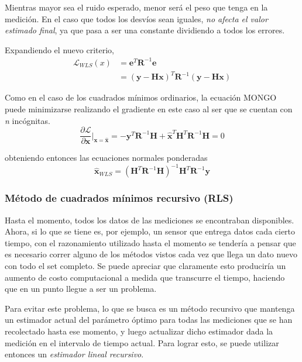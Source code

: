 Mientras mayor sea el ruido esperado, menor será el peso que tenga en la medición. En el caso que todos los desvíos sean iguales, \textit{no afecta el valor estimado final}, ya que pasa a ser una constante dividiendo a todos los errores.

Expandiendo el nuevo criterio,
\begin{align}
    \mathscr{L}_{WLS}(x) &= \bm{e}^T\bm{R}^{-1}\bm{e} \\
                         &= (\bm{y} - \bm{H}\bm{x})^T\bm{R}^{-1}(\bm{y}-\bm{H}\bm{x})
\end{align}

Como en el caso de los cuadrados mínimos ordinarios, la ecuación MONGO puede minimizarse realizando el gradiente en este caso al ser que se cuentan con \textit{n} incógnitas.
\begin{equation}
    \frac{\partial \mathscr{L}}{\partial \bm{x}}\bigg\rvert_{\bm{x}=\hat{\bm{x}}} = -\bm{y}^T\bm{R}^{-1}\bm{H} + \hat{\bm{x}}^T\bm{H}^T\bm{R}^{-1}\bm{H} = 0
\end{equation}

obteniendo entonces las ecuaciones normales ponderadas
\begin{equation}
    \hat{\bm{x}}_{WLS} = (\bm{H}^T\bm{R}^{-1}\bm{H})^{-1} \bm{H}^T\bm{R}^{-1}\bm{y}
\end{equation}

\subsubsection{Método de cuadrados mínimos recursivo (RLS)}

Hasta el momento, todos los datos de las mediciones se encontraban disponibles. Ahora, si lo que se tiene es, por ejemplo, un sensor que entrega datos cada cierto tiempo, con el razonamiento utilizado hasta el momento se tendería a pensar que es necesario correr alguno de los métodos vistos cada vez que llega un dato nuevo con todo el set completo. Se puede apreciar que claramente esto produciría un aumento de costo computacional a medida que transcurre el tiempo, haciendo que en un punto llegue a ser un problema.

Para evitar este problema, lo que se busca es un método recursivo que mantenga un estimador actual del parámetro óptimo para todas las mediciones que se han recolectado hasta ese momento, y luego actualizar dicho estimador dada la medición en el intervalo de tiempo actual. Para lograr esto, se puede utilizar entonces un \textit{estimador lineal recursivo}.

